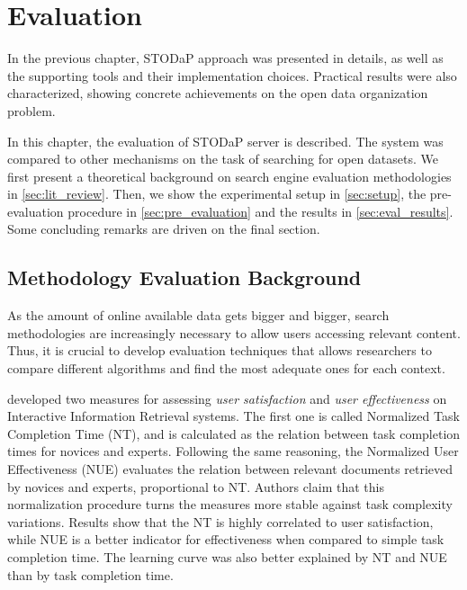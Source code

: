 \chapter{Evaluation}
\label{chap:evaluation}

In the previous chapter, STODaP approach was presented in details, as well as the supporting tools and their implementation choices.
Practical results were also characterized, showing concrete achievements on the open data organization problem.

In this chapter, the evaluation of STODaP server is described.
The system was compared to other mechanisms on the task of searching for open datasets.
We first present a theoretical background on search engine evaluation methodologies in \autoref{sec:lit_review}.
Then, we show the experimental setup in \autoref{sec:setup}, the pre-evaluation procedure in \autoref{sec:pre_evaluation} and the results in \autoref{sec:eval_results}.
Some concluding remarks are driven on the final section.

\section{Methodology Evaluation Background}
\label{sec:lit_review}

As the amount of online available data gets bigger and bigger, search methodologies are increasingly necessary to allow users accessing relevant content.
Thus, it is crucial to develop evaluation techniques that allows researchers to compare different algorithms and find the most adequate ones for each context.

 developed two measures for assessing \emph{user satisfaction} and \emph{user effectiveness} on Interactive Information Retrieval systems.
The first one is called Normalized Task Completion Time (NT), and is calculated as the relation between task completion times for novices and experts.
Following the same reasoning, the Normalized User Effectiveness (NUE) evaluates the relation between relevant documents retrieved by novices and experts, proportional to NT.
Authors claim that this normalization procedure turns the measures more stable against task complexity variations.
Results show that the NT is highly correlated to user satisfaction, while NUE is a better indicator for effectiveness when compared to simple task completion time.
The learning curve was also better explained by NT and NUE than by task completion time.

